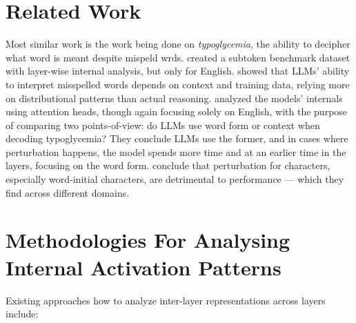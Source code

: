\documentclass[a4paper]{article}
\begin{document}
\section{Related Work}\label{sec:relatedwork}

Most similar work is the work being done on \textit{typoglycemia}, the ability to decipher what word is meant despite mispeld wrds. \textcite{hou2026} created a subtoken benchmark dataset with layer-wise internal analysis, but only for English. \textcite{sperduti2025} showed that LLMs' ability to interpret misspelled words depends on context and training data, relying more on distributional patterns than actual reasoning. \textcite{wang2025b} analyzed the models' internals using attention heads, though again focusing solely on English, with the purpose of comparing two points-of-view: do LLMs use word form or context when decoding typoglycemia? They conclude LLMs use the former, and in cases where perturbation happens, the model spends more time and at an earlier time in the layers, focusing on the word form. \textcite{yu2024} conclude that perturbation for characters, especially word-initial characters, are detrimental to performance --- which they find across different domains.

\section{Methodologies For Analysing Internal Activation Patterns}\label{sec:internalmethods}

Existing approaches how to analyze inter-layer representations across layers include:
\end{document}
